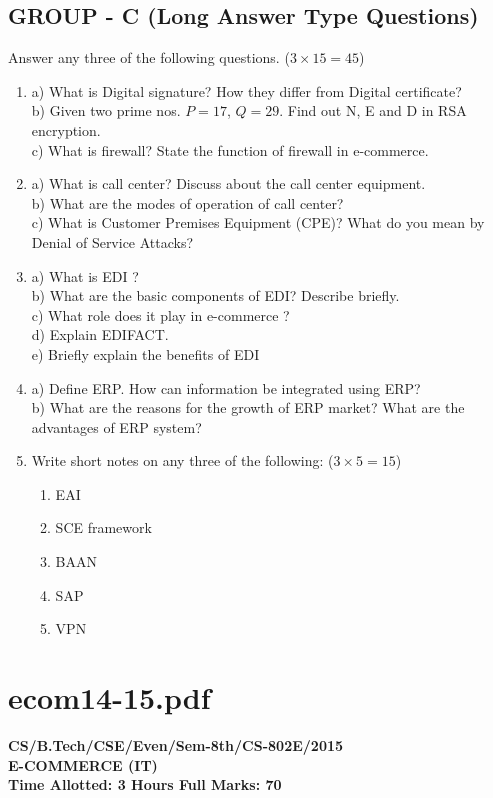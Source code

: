 \subsection*{GROUP - C (Long Answer Type Questions)}
Answer any three of the following questions. ($3 \times 15 = 45$)
\begin{enumerate}
    \item[7.] 
    a) What is Digital signature? How they differ from Digital certificate? \\
    b) Given two prime nos. $P=17$, $Q=29$. Find out N, E and D in RSA encryption. \\
    c) What is firewall? State the function of firewall in e-commerce.
    \item[8.] 
    a) What is call center? Discuss about the call center equipment. \\
    b) What are the modes of operation of call center? \\
    c) What is Customer Premises Equipment (CPE)? What do you mean by Denial of Service Attacks?
    \item[9.] 
    a) What is EDI ? \\
    b) What are the basic components of EDI? Describe briefly. \\
    c) What role does it play in e-commerce ? \\
    d) Explain EDIFACT. \\
    e) Briefly explain the benefits of EDI
    \item[10.] 
    a) Define ERP. How can information be integrated using ERP? \\
    b) What are the reasons for the growth of ERP market? What are the advantages of ERP system?
    \item[11.] Write short notes on any three of the following: ($3 \times 5 = 15$)
    \begin{enumerate}
        \item[a)] EAI
        \item[b)] SCE framework
        \item[c)] BAAN
        \item[d)] SAP
        \item[e)] VPN
    \end{enumerate}
\end{enumerate}

\newpage
\section*{ecom14-15.pdf}
\textbf{CS/B.Tech/CSE/Even/Sem-8th/CS-802E/2015} \\
\textbf{E-COMMERCE (IT)} \\
\textbf{Time Allotted: 3 Hours \hfill Full Marks: 70}

